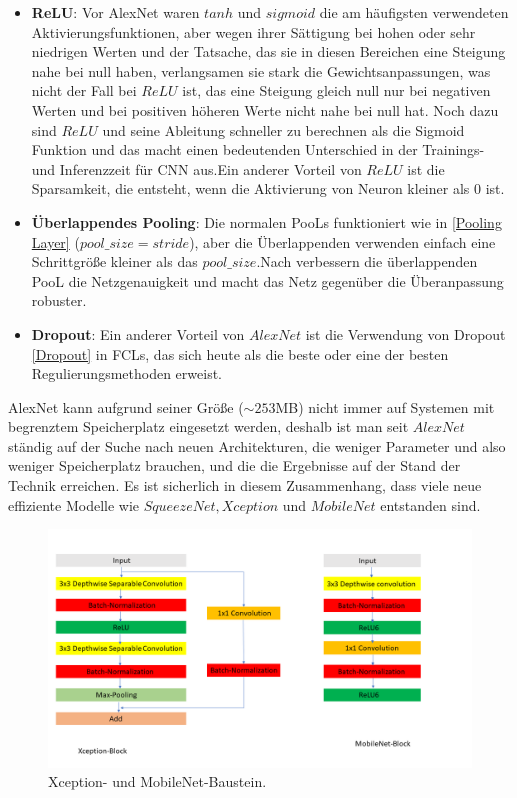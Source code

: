 \documentclass[12pt,a4paper]{scrartcl}
\numberwithin{equation}{section}
\begin{document}
\begin{itemize}
	\item \textbf{ReLU}: Vor AlexNet waren $ tanh $ und $ sigmoid $ die am häufigsten verwendeten Aktivierungsfunktionen, aber wegen ihrer Sättigung bei hohen oder sehr niedrigen Werten und der Tatsache, das sie in diesen Bereichen eine Steigung nahe bei null haben, verlangsamen sie stark die Gewichtsanpassungen, was nicht der Fall bei $ ReLU $ ist, das eine Steigung gleich null nur bei negativen Werten und bei positiven höheren Werte  nicht nahe bei null hat. Noch dazu sind $ ReLU $ und seine Ableitung schneller zu berechnen als die Sigmoid Funktion und das macht einen bedeutenden Unterschied in der Trainings- und Inferenzzeit für CNN aus.Ein anderer Vorteil von $ ReLU $ ist die Sparsamkeit, die entsteht, wenn die Aktivierung von Neuron kleiner als 0 ist.
	
	\item \textbf{Überlappendes Pooling}: Die normalen \acsp{PooL} funktioniert wie in \ref{Pooling Layer} ($ pool\_size = stride$), aber die Überlappenden verwenden einfach eine Schrittgröße kleiner als das $ pool\_size $.Nach \cite{AlexNet} verbessern die überlappenden {PooL}  die Netzgenauigkeit und macht das Netz gegenüber die Überanpassung robuster.
	\item \textbf{Dropout}: Ein anderer Vorteil von $ AlexNet $ ist die Verwendung von Dropout \ref{Dropout} in \acsp{FCL}, das sich heute als die beste oder eine der besten Regulierungsmethoden erweist.
\end{itemize}



AlexNet kann aufgrund seiner Größe ($\sim253$MB) nicht immer auf Systemen mit begrenztem Speicherplatz eingesetzt werden, deshalb ist man seit $ AlexNet $ ständig auf der Suche nach neuen Architekturen, die weniger Parameter und also weniger Speicherplatz brauchen, und die die Ergebnisse auf der Stand der Technik erreichen. Es ist sicherlich  in diesem Zusammenhang, dass viele neue effiziente Modelle wie $SqueezeNet, Xception $ und $ MobileNet $ entstanden sind.

\begin{figure}[h!]
	\centering
	\includegraphics[width=\textwidth ]{Convolution/Folie3}
	\caption{Xception- und MobileNet-Baustein.}
	\label{fig:Xception|MobileNet}
\end{figure}
\end{document}
